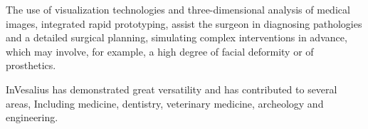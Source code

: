 
The use of visualization technologies and three-dimensional analysis of medical images, integrated rapid prototyping, assist the surgeon in diagnosing pathologies and a detailed surgical planning, simulating complex interventions in advance, which may involve, for example, a high degree of facial deformity or of prosthetics.


InVesalius has demonstrated great versatility and has contributed to several areas,
Including medicine, dentistry, veterinary medicine, archeology and engineering.
		
\noindent
